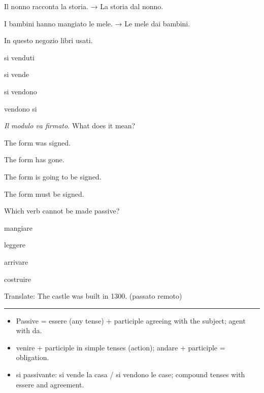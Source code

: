 \documentclass[11pt,a4paper,twoside,openright]{book}
\newcommand{\blank}{\underline{\hspace{2.6cm}}}
\newcommand{\answerline}{\par\vspace{6pt}\noindent\rule{0.75\linewidth}{0.4pt}\par}
\begin{document}
\begin{exercises}
\item\label{ex:forma-passiva-1}\relax Il nonno racconta la storia. → La storia \blank{} dal nonno.
\item\label{ex:forma-passiva-2}\relax I bambini hanno mangiato le mele. → Le mele \blank{} dai bambini.
\item\label{ex:forma-passiva-3}\relax In questo negozio \blank{} libri usati.\par\nopagebreak\begin{options}
\item\relax si venduti
\item\relax si vende
\item\relax si vendono
\item\relax vendono si
\end{options}
\item\label{ex:forma-passiva-4}\relax \textit{Il modulo va firmato.} What does it mean?\par\nopagebreak\begin{options}
\item\relax The form was signed.
\item\relax The form has gone.
\item\relax The form is going to be signed.
\item\relax The form must be signed.
\end{options}
\item\label{ex:forma-passiva-5}\relax Which verb cannot be made passive?\par\nopagebreak\begin{options}
\item\relax mangiare
\item\relax leggere
\item\relax arrivare
\item\relax costruire
\end{options}
\item\label{ex:forma-passiva-6}\relax Translate: The castle was built in 1300. (passato remoto)\par\answerline
\end{exercises}

\begin{summarybox}
\begin{itemize}
\item\relax Passive = essere (any tense) + participle agreeing with the subject; agent with da.
\item\relax venire + participle in simple tenses (action); andare + participle = obligation.
\item\relax si passivante: si vende la casa / si vendono le case; compound tenses with essere and agreement.
\end{itemize}
\end{summarybox}
\end{document}
